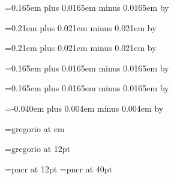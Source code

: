 \newskip\spaceafterlineclef
\spaceafterlineclef=0.165em plus 0.0165em minus 0.0165em
\multiply\spaceafterlineclef by \factor

\newskip\interwordspacenotes
\interwordspacenotes=0.21em plus 0.021em minus 0.021em
\multiply\interwordspacenotes by \factor

\newskip\interwordspacetext
\interwordspacetext=0.21em plus 0.021em minus 0.021em
\multiply\interwordspacetext by \factor

\newskip\bispace
\bispace=0.165em plus 0.0165em minus 0.0165em
\multiply\bispace by \factor

\newskip\trispace
\trispace=0.165em plus 0.0165em minus 0.0165em
\multiply\trispace by \factor

\newskip\punctuminclinatumshift
\punctuminclinatumshift=-0.040em plus 0.004em minus 0.004em
\multiply\punctuminclinatumshift by \factor



\newskip\barspace

\newskip\clefchangespace


\font\gregorianfont=gregorio at \the\factor em

\font\gregoriantextfont=gregorio at 12pt

\font\textfont=pncr at 12pt
\font\fontofinitial=pncr at 40pt

\def\Abar{%
{\gregoriantextfont \char 66}%
}

\def\Rbar{%
{\gregoriantextfont \char 67}%
}

\def\Vbar{%
{\gregoriantextfont \char 68}%
}

\def\setgregorianfont#1{%
\global\font\gregorianfont=#1 at \the\factor em%
\global\font\gregoriantextfont=#1 at 12pt%
}
